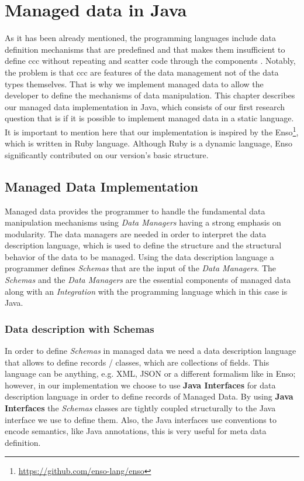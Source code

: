 
\chapter{Managed data in Java}\label{Implementation}

As it has been already mentioned, the programming languages include data definition mechanisms that are predefined and that makes them insufficient to define \ac{ccc} without repeating and scatter code through the components \cite{loh2012managed}.
Notably, the problem is that \ac{ccc} are features of the data management not of the data types themselves.
That is why we implement managed data to allow the developer to define the mechanisms of data manipulation.
This chapter describes our managed data implementation in Java, which consists of our first research question that is if it is possible to implement managed data in a static language.
It is important to mention here that our implementation is inspired by the Enso\footnote{\url{https://github.com/enso-lang/enso}}, which is written in Ruby language. 
Although Ruby is a dynamic language, Enso significantly contributed on our version's basic structure.

\section{Managed Data Implementation}\label{sec:Managed Data Implementation}
Managed data provides the programmer to handle the fundamental data manipulation mechanisms using \textit{Data Managers} having a strong emphasis on modularity.
The data managers are needed in order to interpret the data description language, which is used to define the structure and the structural behavior of the data to be managed.
Using the data description language a programmer defines \textit{Schemas} that are the input of the \textit{Data Managers}.
The \textit{Schemas} and the \textit{Data Managers} are the essential components of managed data along with an \textit{Integration} with the programming language which in this case is Java.

\subsection{Data description with Schemas}\label{Schema Definition}
In order to define \textit{Schemas} in managed data we need a data description language that allows to define records / classes, which are collections of fields. 
This language can be anything, e.g. XML, JSON or a different formalism like in Enso; however, in our implementation we choose to use \textbf{Java Interfaces} for data description language in order to define records of Managed Data.
By using \textbf{Java Interfaces} the \textit{Schemas} classes are tightly coupled structurally to the Java interface we use to define them. 
Also, the Java interfaces use conventions to encode semantics, 
like Java annotations, this is very useful for meta data definition.

